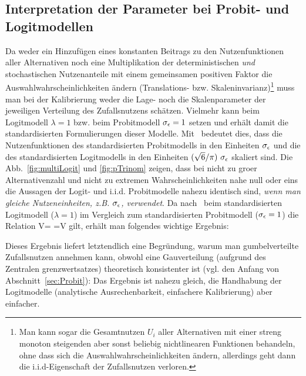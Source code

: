 \subsection{\label{sec:nutzeninterpretation}Interpretation der Parameter
     bei Probit- und Logitmodellen}
Da weder ein Hinzuf\"ugen eines konstanten Beitrags zu den
Nutzenfunktionen aller Alternativen noch eine Multiplikation der
deterministischen \emph{und} stochastischen Nutzenanteile mit einem
gemeinsamen positiven Faktor die
  Auswahlwahrscheinlichkeiten \"andern (Translations-
bzw. Skaleninvarianz)\footnote{Man kann sogar die Gesamtnutzen $U_i$
  aller Alternativen mit einer streng monoton steigenden aber sonst
  beliebig nichtlinearen Funktionen behandeln, ohne dass sich die
  Auswahlwahrscheinlichkeiten \"andern, allerdings geht dann die
  i.i.d-Eigenschaft der Zufallsnutzen verloren.}
muss man bei der Kalibrierung weder die Lage- noch die Skalenparameter
der jeweiligen Verteilung des
Zufallsnutzens sch\"atzen. Vielmehr kann beim Logitmodell $\lambda=1$
bzw. beim Probitmodell $\sigma_{\epsilon}=1$
setzen und erh\"alt damit die standardisierten Formulierungen dieser
Modelle.
 Mit~ bedeutet dies, dass die Nutzenfunktionen
 des standardisierten Probitmodells in den Einheiten $\sigma_{\epsilon}$ und
 die des standardisierten 
 Logitmodells in den Einheiten $(\sqrt{6}/\pi)\ \sigeps$
skaliert sind. Die Abb.~\ref{fig:multiLogit} und \ref{fig:pTrinom} zeigen, dass
 bei nicht zu gro\3er Alternativenzahl und nicht zu extremen
 Wahrscheinlichkeiten nahe null oder eins die Aussagen
der Logit- und i.i.d. Probitmodelle nahezu identisch sind, \emph{wenn
  man gleiche Nutzeneinheiten, z.B. $\sigma_{\epsilon}$, verwendet}. Da
nach~ beim standardisierten Logitmodell
($\lambda=1$) im Vergleich zum standardisierten Probitmodell
($\sigma_{\epsilon}=1$)  die Relation
\bdm
V= 
=V
\edm
gilt, erh\"alt man folgendes 
wichtige Ergebnis:


Dieses Ergebnis liefert letztendlich eine Begr\"undung, warum man
gumbelverteilte Zufallsnutzen annehmen kann, obwohl eine
Gau\3verteilung (aufgrund des Zentralen grenzwertsatzes) theoretisch
konsistenter ist  (vgl. den Anfang von
Abschnitt~\ref{sec:Probit}):  
Das Ergebnis ist nahezu gleich, die
Handhabung der Logitmodelle (analytische Ausrechenbarkeit, einfachere Kalibrierung) aber einfacher.

